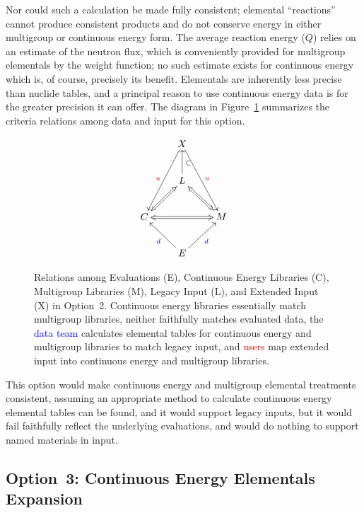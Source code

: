 \documentclass[12pt]{lamemo}
\begin{document}
Nor could such a calculation be made fully consistent; elemental
``reactions'' cannot produce consistent products and do not conserve
energy in either multigroup or continuous energy form.  The average
reaction energy ($Q$) relies on an estimate of the neutron flux, which
is conveniently provided for multigroup elementals by the weight
function\cite[Kinetic Quantities]{gray09}; no such estimate exists for
continuous energy which is, of course, precisely its benefit.
Elementals are inherently less precise than nuclide tables, and a
principal reason to use continuous energy data is for the greater
precision it can offer.  The diagram in Figure~\ref{fig:2} summarizes
the criteria relations among data and input for this option.

\begin{figure}\centering
\[
\xymatrix{
  & X \ar[ddl]_{\textcolor{red}{u}} \ar[ddr]^{\textcolor{red}{u}} & \\
  & L \ar@{<=>}[dl] \ar@{<=>}[dr] \ar[u]_{\subset} & \\
  C \ar@{<=>}[rr] & & M \\
  & E \ar[ul]^{\textcolor{blue}{d}} \ar[ur]_{\textcolor{blue}{d}}&
}
\]
\caption{Relations among Evaluations (E), Continuous Energy Libraries
  (C), Multigroup Libraries (M), Legacy Input (L), and Extended Input
  (X) in Option~2.  Continuous energy libraries essentially match
  multigroup libraries, neither faithfully matches evaluated data, the
  \textcolor{blue}{data team} calculates elemental tables for
  continuous energy and multigroup libraries to match legacy input,
  and \textcolor{red}{users} map extended input into continuous energy
  and multigroup libraries.} \label{fig:2}
\end{figure}

This option would make continuous energy and multigroup elemental
treatments consistent, assuming an appropriate method to calculate
continuous energy elemental tables can be found, and it would support
legacy inputs, but it would fail faithfully reflect the underlying
evaluations, and would do nothing to support named materials in input.

\subsection{Option~3: Continuous Energy Elementals Expansion}\mbox{}\\ 
\end{document}
